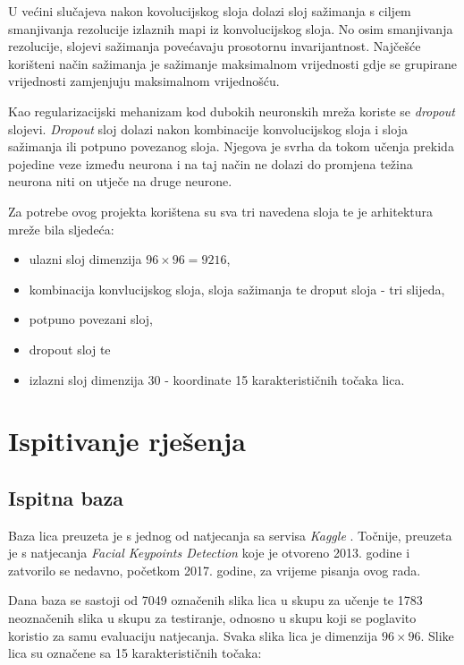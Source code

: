 \documentclass[times, utf8, zavrsni, numeric]{fer}
\begin{document}
U većini slučajeva nakon kovolucijskog sloja dolazi sloj sažimanja s ciljem smanjivanja rezolucije izlaznih mapi iz konvolucijskog sloja. No osim smanjivanja rezolucije, slojevi sažimanja povećavaju prosotornu invarijantnost. Najčešće korišteni način sažimanja je sažimanje maksimalnom vrijednosti gdje se grupirane vrijednosti zamjenjuju maksimalnom vrijednošću.

Kao regularizacijski mehanizam kod dubokih neuronskih mreža koriste se \emph{dropout} slojevi. \emph{Dropout} sloj dolazi nakon kombinacije konvolucijskog sloja i sloja sažimanja ili potpuno povezanog sloja. Njegova je svrha da tokom učenja prekida pojedine veze između neurona i na taj način ne dolazi do promjena težina neurona niti on utječe na druge neurone.

Za potrebe ovog projekta korištena su sva tri navedena sloja te je arhitektura mreže bila sljedeća:

\begin{itemize}
    \item ulazni sloj dimenzija $96 \times 96 = 9216$, 
    \item kombinacija konvlucijskog sloja, sloja sažimanja te droput sloja - tri slijeda,
    \item potpuno povezani sloj,
    \item dropout sloj te
    \item izlazni sloj dimenzija $30$ - koordinate 15 karakterističnih točaka lica.
\end{itemize}

\chapter{Ispitivanje rješenja}

\section{Ispitna baza}

Baza lica preuzeta je s jednog od natjecanja sa servisa \emph{Kaggle} \citep{kaggle}. Točnije, preuzeta je s natjecanja \emph{Facial Keypoints Detection} koje je otvoreno 2013. godine i zatvorilo se nedavno, početkom 2017. godine, za vrijeme pisanja ovog rada.

Dana baza se sastoji od 7049 označenih slika lica u skupu za učenje te 1783 neoznačenih slika u skupu za testiranje, odnosno u skupu koji se poglavito koristio za samu evaluaciju natjecanja. Svaka slika lica je dimenzija $96 \times 96$. Slike lica su označene sa 15 karakterističnih točaka:
\end{document}
